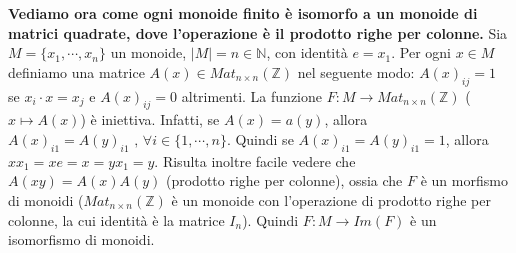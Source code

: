 \documentclass[a4paper,12pt]{article}
\theoremstyle{def}
\theoremstyle{prop}
\theoremstyle{esempio}
\theoremstyle{dimostrazione}
\theoremstyle{teo}
\theoremstyle{osservazione}
\begin{document}
\textbf{Vediamo ora come ogni monoide finito è isomorfo a un monoide di matrici quadrate, dove l'operazione
    è il prodotto righe per colonne.}\newline
Sia \(M=\{x_1,\cdots,x_n\}\) un monoide, \(|M|=n \in \mathbb{N}\), con identità \(e = x_1\). Per ogni \(x \in
M\) definiamo una matrice \(A(x) \in Mat_{n \times n}(\mathbb{Z})\) nel seguente modo: \(A(x)_{ij} = 1\)
se \(x_i \cdot x = x_j\) e \(A(x)_{ij} = 0\) altrimenti. La funzione \(F : M \rightarrow Mat_{n \times n}
(\mathbb{Z})\) (\(x \mapsto A(x)\)) è iniettiva.\newline
Infatti, se \(A(x) = a(y)\), allora \(A(x)_{i1} = A(y)_{i1} \text{ , } \forall i \in \{1,\cdots,n\}\).\newline
Quindi se \(A(x)_{i1} = A(y)_{i1} = 1\), allora \(xx_1 = xe = x = yx_1 = y\).\newline
Risulta inoltre facile vedere che \(A(xy) = A(x)A(y)\) (prodotto righe per colonne), ossia che \(F\) è
un morfismo di monoidi (\(Mat_{n \times n}(\mathbb{Z})\) è un monoide con l'operazione di
prodotto righe per colonne, la cui identità è la matrice \(I_n\)).\newline
Quindi \(F: M \rightarrow Im(F)\) è un isomorfismo di monoidi.
\end{document}
